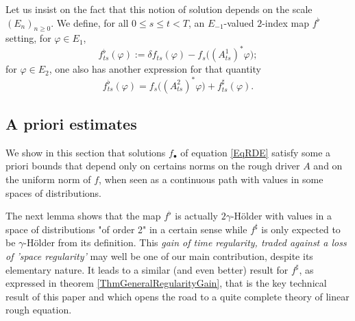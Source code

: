 \documentclass[11pt,a4paper]{amsart}
\renewcommand{\leq}{\leqslant}
\renewcommand{\geq}{\geqslant}
\newcommand{\ssk}{\smallskip}
\numberwithin{equation}{section} %
\begin{document}
\ssk

Let us insist on the fact that this notion of solution depends on the scale $(E_n)_{n\geq 0}$. We define, for all $0\leq s\leq t<T$, an  $E_{-1}$-valued $2$-index map $f^\flat$ setting, for $\varphi\in E_1$,
\begin{equation*}
f^\flat_{ts}(\varphi) := \delta f_{ts}(\varphi) - f_s\big((A_{ts}^1)^*\varphi\big);
\end{equation*}
for $\varphi\in E_2$, one also has another expression for that quantity
$$
f^\flat_{ts}(\varphi) = f_s\big((A^2_{ts})^*\varphi\big) + f^\sharp_{ts}(\varphi).
$$


\bigskip


\subsection{A priori estimates}
\label{SubsectionAPrioriEstimates}

We show in this section that solutions $f_\bullet$ of equation \eqref{EqRDE} satisfy some a priori bounds that depend only on certains norms on the rough driver $A$ and on the uniform norm of $f$, when seen as a continuous path with values in some spaces of distributions. 

\ssk

The next lemma shows that the map $f^\flat$ is actually $2\gamma$-H\"older with values in a  space of distributions "of order 2" in a certain sense while $f^\sharp$ is only expected to be $\gamma$-H\"older from its definition. This \textit{gain of time regularity, traded against a loss of 'space regularity'} may well be one of our main contribution, despite its elementary nature. It leads to a similar (and even better) result for $f^\sharp$, as expressed in theorem \ref{ThmGeneralRegularityGain}, that is the key technical result of this paper and which opens the road  to a quite complete theory of linear rough equation.
\end{document}
